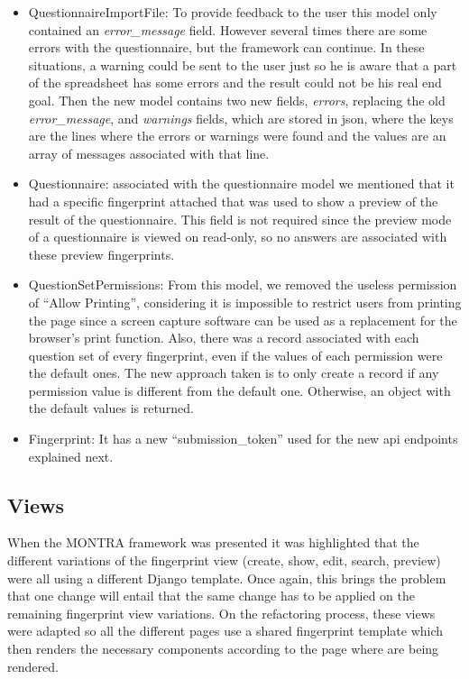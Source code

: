 \begin{itemize}
    \item QuestionnaireImportFile: To provide feedback to the user this model only contained an \textit{error\_message} field.
        However several times there are some errors with the questionnaire, but the framework can continue.
        In these situations, a warning could be sent to the user just so he is aware that a part of the spreadsheet has some errors and the result could not be his real end goal.
        Then the new model contains two new fields, \textit{errors}, replacing the old \textit{error\_message}, and \textit{warnings} fields, which are stored in \gls{json}, where the keys are the lines where the errors or warnings were found and the values are an array of messages associated with that line.
    \item Questionnaire: associated with the questionnaire model we mentioned that it had a specific fingerprint attached that was used to show a preview of the result of the questionnaire.
        This field is not required since the preview mode of a questionnaire is viewed on read-only, so no answers are associated with these preview fingerprints.
    \item QuestionSetPermissions: From this model, we removed the useless permission of ``Allow Printing'', considering it is impossible to restrict users from printing the page since a screen capture software can be used as a replacement for the browser's print function.
        Also, there was a record associated with each question set of every fingerprint, even if the values of each permission were the default ones.
        The new approach taken is to only create a record if any permission value is different from the default one.
        Otherwise, an object with the default values is returned.
    \item Fingerprint: It has a new ``submission\_token'' used for the new \gls{api} endpoints explained next.
\end{itemize}

\subsection{Views}

When the MONTRA framework was presented it was highlighted that the different variations of the fingerprint view (create, show, edit, search, preview) were all using a different Django template.
Once again, this brings the problem that one change will entail that the same change has to be applied on the remaining fingerprint view variations.
On the refactoring process, these views were adapted so all the different pages use a shared fingerprint template which then renders the necessary components according to the page where are being rendered.

